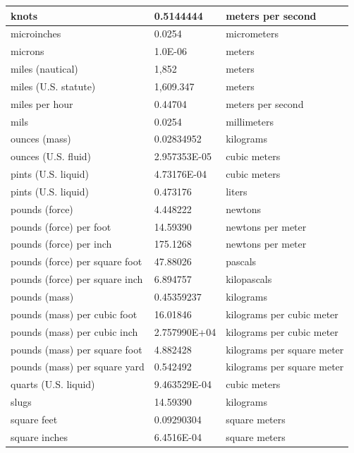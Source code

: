\documentclass{template/openetcs_article_nocc}
\begin{document}
{\begin{longtable}{||l|l|l||}
    \hline
    knots & 0.5144444 & meters per second\\
    \hline
    microinches & 0.0254 & micrometers\\
    \hline
    microns & 1.0E-06 & meters\\
    \hline
    miles (nautical) & 1,852 & meters\\
    \hline
    miles (U.S. statute) & 1,609.347 & meters\\
    \hline
    miles per hour & 0.44704 & meters per second\\
    \hline
    mils & 0.0254 & millimeters\\
    \hline
    ounces (mass) & 0.02834952 & kilograms\\
    \hline
    ounces (U.S. fluid) & 2.957353E-05 & cubic meters\\
    \hline
    pints (U.S. liquid) & 4.73176E-04 & cubic meters\\
    \hline
    pints (U.S. liquid) & 0.473176 & liters\\
    \hline
    pounds (force) & 4.448222 & newtons\\
    \hline
    pounds (force) per foot & 14.59390 & newtons per meter\\
    \hline
    pounds (force) per inch & 175.1268 & newtons per meter\\
    \hline
    pounds (force) per square foot & 47.88026 & pascals\\
    \hline
    pounds (force) per square inch & 6.894757 & kilopascals\\
    \hline
    pounds (mass) & 0.45359237 & kilograms\\
    \hline
    pounds (mass) per cubic foot & 16.01846 & kilograms per cubic meter\\
    \hline
    pounds (mass) per cubic inch & 2.757990E+04 & kilograms per cubic meter\\
    \hline
    pounds (mass) per square foot & 4.882428 & kilograms per square meter\\
    \hline
    pounds (mass) per square yard & 0.542492 & kilograms per square meter\\
    \hline
    quarts (U.S. liquid) & 9.463529E-04 & cubic meters\\
    \hline
    slugs & 14.59390 & kilograms\\
    \hline
    square feet & 0.09290304 & square meters\\
    \hline
    square inches & 6.4516E-04 & square meters\\
    \hline

\end{longtable}}
\end{document}
